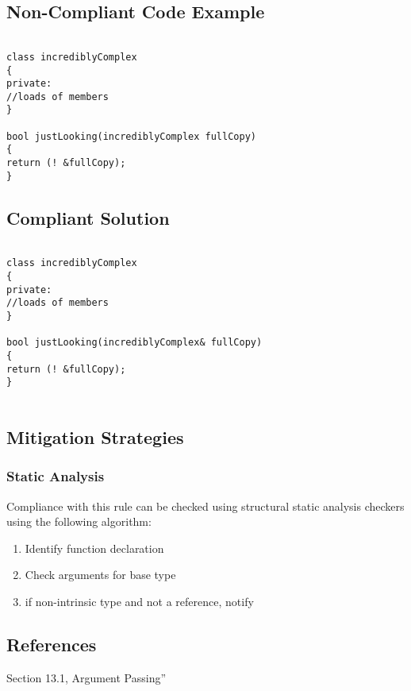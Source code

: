 \subsection{Non-Compliant Code Example}


\begin{verbatim}

class incrediblyComplex
{
private:
//loads of members
}

bool justLooking(incrediblyComplex fullCopy)
{
return (! &fullCopy);
}

\end{verbatim}

\subsection{Compliant Solution}


\begin{verbatim}

class incrediblyComplex
{
private:
//loads of members
}

bool justLooking(incrediblyComplex& fullCopy)
{
return (! &fullCopy);
}


\end{verbatim}

\subsection{Mitigation Strategies}
\subsubsection{Static Analysis} 

Compliance with this rule can be checked using structural static analysis checkers using the following algorithm:

\begin{enumerate}
\item Identify function declaration
\item Check arguments for base type
\item if non-intrinsic type and not a reference, notify
\end{enumerate}

\subsection{References}

 Section 13.1,
Argument Passing''